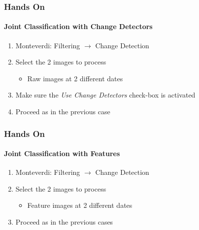 \documentclass[compress]{beamer}
\begin{document}
\begin{frame}
  \frametitle{Hands On}
  \framesubtitle{Joint Classification with Change Detectors}
  \begin{enumerate}
  \item Monteverdi: Filtering $\rightarrow$ Change Detection
  \item Select the 2 images to process
    \begin{itemize}
    \item Raw images at 2 different dates
    \end{itemize}
  \item Make sure the {\em Use Change Detectors} check-box is activated
  \item Proceed as in the previous case
  \end{enumerate}
\end{frame}

\begin{frame}
  \frametitle{Hands On}
  \framesubtitle{Joint Classification with Features}
  \begin{enumerate}
  \item Monteverdi: Filtering $\rightarrow$ Change Detection
  \item Select the 2 images to process
    \begin{itemize}
    \item Feature images at 2 different dates
    \end{itemize}
  \item Proceed as in the previous cases
  \end{enumerate}
\end{frame}
\end{document}
